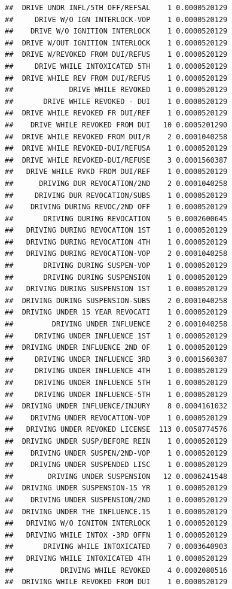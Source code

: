 \documentclass[]{book}
\begin{document}
\begin{verbatim}
##  DRIVE UNDR INFL/5TH OFF/REFSAL    1 0.0000520129
##     DRIVE W/O IGN INTERLOCK-VOP    1 0.0000520129
##    DRIVE W/O IGNITION INTERLOCK    1 0.0000520129
##  DRIVE W/OUT IGNITION INTERLOCK    1 0.0000520129
##  DRIVE W/REVOKED FROM DUI/REFUS    1 0.0000520129
##     DRIVE WHILE INTOXICATED 5TH    1 0.0000520129
##  DRIVE WHILE REV FROM DUI/REFUS    1 0.0000520129
##             DRIVE WHILE REVOKED    1 0.0000520129
##       DRIVE WHILE REVOKED - DUI    1 0.0000520129
##  DRIVE WHILE REVOKED FR DUI/REF    1 0.0000520129
##    DRIVE WHILE REVOKED FROM DUI   10 0.0005201290
##  DRIVE WHILE REVOKED FROM DUI/R    2 0.0001040258
##  DRIVE WHILE REVOKED-DUI/REFUSA    1 0.0000520129
##  DRIVE WHILE REVOKED-DUI/REFUSE    3 0.0001560387
##   DRIVE WHILE RVKD FROM DUI/REF    1 0.0000520129
##      DRIVING DUR REVOCATION/2ND    2 0.0001040258
##     DRIVING DUR REVOCATION/SUBS    1 0.0000520129
##    DRIVING DURING REVOC/2ND OFF    1 0.0000520129
##       DRIVING DURING REVOCATION    5 0.0002600645
##   DRIVING DURING REVOCATION 1ST    1 0.0000520129
##   DRIVING DURING REVOCATION 4TH    1 0.0000520129
##   DRIVING DURING REVOCATION-VOP    2 0.0001040258
##       DRIVING DURING SUSPEN-VOP    1 0.0000520129
##       DRIVING DURING SUSPENSION    1 0.0000520129
##   DRIVING DURING SUSPENSION 1ST    1 0.0000520129
##  DRIVING DURING SUSPENSION-SUBS    2 0.0001040258
##  DRIVING UNDER 15 YEAR REVOCATI    1 0.0000520129
##         DRIVING UNDER INFLUENCE    2 0.0001040258
##     DRIVING UNDER INFLUENCE 1ST    1 0.0000520129
##  DRIVING UNDER INFLUENCE 2ND OF    1 0.0000520129
##     DRIVING UNDER INFLUENCE 3RD    3 0.0001560387
##     DRIVING UNDER INFLUENCE 4TH    1 0.0000520129
##     DRIVING UNDER INFLUENCE 5TH    1 0.0000520129
##     DRIVING UNDER INFLUENCE-5TH    1 0.0000520129
##  DRIVING UNDER INFLUENCE/INJURY    8 0.0004161032
##    DRIVING UNDER REVOCATION-VOP    1 0.0000520129
##   DRIVING UNDER REVOKED LICENSE  113 0.0058774576
##  DRIVING UNDER SUSP/BEFORE REIN    1 0.0000520129
##    DRIVING UNDER SUSPEN/2ND-VOP    1 0.0000520129
##    DRIVING UNDER SUSPENDED LISC    1 0.0000520129
##        DRIVING UNDER SUSPENSION   12 0.0006241548
##  DRIVING UNDER SUSPENSION-15 YR    1 0.0000520129
##    DRIVING UNDER SUSPENSION/2ND    1 0.0000520129
##  DRIVING UNDER THE INFLUENCE.15    1 0.0000520129
##   DRIVING W/O IGNITON INTERLOCK    1 0.0000520129
##   DRIVING WHILE INTOX -3RD OFFN    1 0.0000520129
##       DRIVING WHILE INTOXICATED    7 0.0003640903
##   DRIVING WHILE INTOXICATED 4TH    1 0.0000520129
##           DRIVING WHILE REVOKED    4 0.0002080516
##  DRIVING WHILE REVOKED FROM DUI    1 0.0000520129

\end{verbatim}
\end{document}
